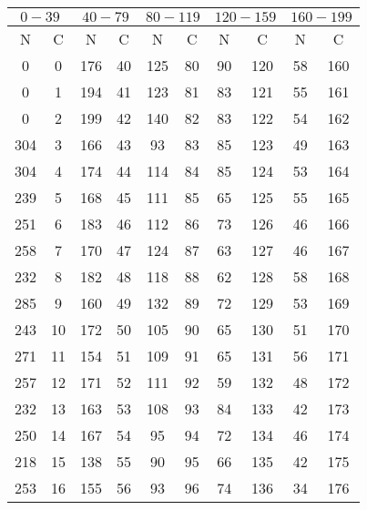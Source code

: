 \begin{table}
    \centering
    \caption{} 
    \label{}
    \begin{tabular}{c c || c c || c c || c c || c c}
        \midrule
        \multicolumn{2}{c}{$0-39$} & \multicolumn{2}{c}{$40-79$} & \multicolumn{2}{c}{$80-119$} & \multicolumn{2}{c}{$120-159$} & \multicolumn{2}{c}{$160-199$} \\
        \midrule
        N & C & N & C & N & C & N & C & N & C \\
        \midrule
0        &   0     &176      &   40&125     &    80  &90      &120 & 58     & 160  \\
0        &   1     &194      &   41&123     &    81  &83      &121 & 55     & 161  \\
0        &   2     &199      &   42&140     &    82  &83      &122 & 54     & 162  \\
304      &   3     &166      &   43&93      &    83  &85      &123 & 49     & 163  \\
304      &   4     &174      &   44&114     &    84  &85      &124 & 53     & 164  \\
239      &   5     &168      &   45&111     &    85  &65      &125 & 55     & 165  \\
251      &   6     &183      &   46&112     &    86  &73      &126 & 46     & 166  \\
258      &   7     &170      &   47&124     &    87  &63      &127 & 46     & 167  \\
232      &   8     &182      &   48&118     &    88  &62      &128 & 58     & 168  \\
285      &   9     &160      &   49&132     &    89  &72      &129 & 53     & 169  \\
243      &   10    &172      &   50&105     &    90  &65      &130 & 51     & 170  \\
271      &   11    &154      &   51&109     &    91  &65      &131 & 56     & 171  \\
257      &   12    &171      &   52&111     &    92  &59      &132 & 48     & 172  \\
232      &   13    &163      &   53&108     &    93  &84      &133 & 42     & 173  \\
250      &   14    &167      &   54&95      &    94  &72      &134 & 46     & 174  \\
218      &   15    &138      &   55&90      &    95  &66      &135 & 42     & 175  \\
253      &   16    &155      &   56&93      &    96  &74      &136 & 34     & 176  \\

\end{tabular}
\end{table}
